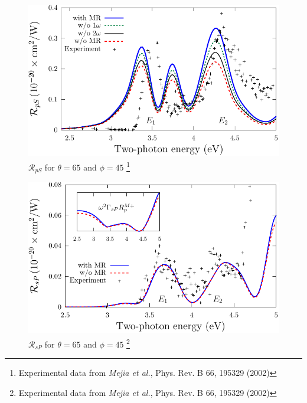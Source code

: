 \documentclass{beamer}
\begin{document}
\begin{frame}
\begin{figure}
\centering
\includegraphics[width=\textwidth]{fig-Si1x1-Mejia_RpS}
\caption{$\mathcal{R}_{pS}$ for $\theta=65$ and $\phi=45$%
\footnote{Experimental data from \emph{Mejia et al.}, Phys. Rev. B 66, 195329 (2002)}}
\end{figure}
\end{frame}

\begin{frame}
\begin{figure}
\centering
\includegraphics[width=\textwidth]{fig-Si1x1-Mejia_RsP}
\caption{$\mathcal{R}_{sP}$ for $\theta=65$ and $\phi=45$%
\footnote{Experimental data from \emph{Mejia et al.}, Phys. Rev. B 66, 195329 (2002)}}
\end{figure}
\end{frame}
\end{document}
